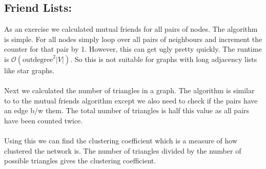 \subsection{Friend Lists:}
As an exercise we calculated mutual friends for all pairs of nodes. The algorithm is simple. For all nodes simply loop over all pairs of neighbours and increment the counter for that pair by 1. However, this can get ugly pretty quickly. The runtime is $\mathcal{O}(\text{outdegree}^2|V|)$. So this is not suitable for graphs with long adjacency lists like star graphs.
\\
\\
Next we calculated the number of triangles in a graph. The algorithm is similar to to the mutual friends algorithm except we also need to check if the pairs have an edge b/w them. The total number of triangles is half this value as all pairs have been counted twice. 
\\
\\
Using this we can find the clustering coefficient which is a measure of how clustered the network is. The number of triangles divided by the number of possible triangles gives the clustering coefficient.